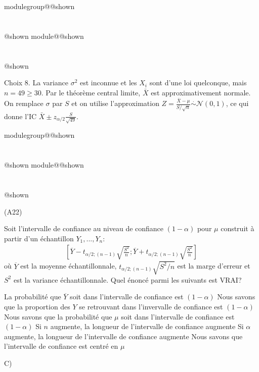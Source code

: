 \documentclass{Evaluation}
\makeatletter
\newcommand{\currentmodulekey}{}
\newcommand{\currentmoduletitle}{}
\newcommand{\currentgroupkey}{}
\newcommand{\currentgrouptitle}{}
\newcommand{\showmoduleifneeded}{%
  \ifx\currentgroupkey\empty\else
    \expandafter\ifx\csname modulegroup@\currentgroupkey @shown\endcsname\relax
      \section*{\currentgrouptitle}%
      \expandafter\gdef\csname modulegroup@\currentgroupkey @shown\endcsname{1}%
    \fi
  \fi
  \expandafter\ifx\csname module@\currentmodulekey @shown\endcsname\relax
    \section*{\currentmoduletitle}%
    \expandafter\gdef\csname module@\currentmodulekey @shown\endcsname{1}%
  \fi
}
\newenvironment{A22}{\showmoduleifneeded}{}
\newenvironment{A25}{\showmoduleifneeded}{}
\makeatother
\begin{document}
\begin{questions}
\begin{A25}
\begin{parts}
\medskip  
\begin{oneparcheckboxes}

 \end{oneparcheckboxes}\medskip
 \begin{solution}
 Choix 8. La variance $\sigma^2$ est inconnue et les $X_i$ sont d'une loi quelconque, mais $n = 49 \geq 30$. Par le théorème central limite, $\bar{X}$ est approximativement normale. On remplace $\sigma$ par $S$ et on utilise l'approximation $Z = \frac{\bar{X} - \mu}{S/\sqrt{n}} \stackrel{\cdot}{\sim} \mathcal{N}(0,1)$, ce qui donne l'IC $\bar{X} \pm z_{\alpha/2} \frac{S}{\sqrt{49}}$.
 \end{solution}
 \end{parts}
\end{A25}





\begin{A22}
\question
(A22)

Soit l'intervalle de confiance au niveau de confiance $(1-\alpha)$ pour $\mu$ construit à partir d'un échantillon $Y_1,...,Y_n$:
\begin{align*}
    \left[\overline{Y}- t_{\alpha/2;(n-1)}\sqrt{\frac{S^2}{n}};\overline{Y}+ t_{\alpha/2;(n-1)}\sqrt{\frac{S^2}{n}}\right]
\end{align*}
où $\overline{Y}$ est la moyenne échantillonnale, $t_{\alpha/2;(n-1)}\sqrt{S^2/n}$ est la marge d'erreur et $S^2$ est la variance échantillonnale.
Quel énoncé parmi les suivants est VRAI?

\begin{checkboxes}
    \choice La probabilité que $\overline{Y}$ soit dans l'intervalle de confiance est $(1-\alpha)$
    \choice Nous savons que la proportion des $Y$ se retrouvant dans l'invervalle de confiance est $(1-\alpha)$
    \CorrectChoice Nous savons que la probabilité que $\mu$ soit dans l'intervalle de confiance est $(1-\alpha)$
    \choice Si $n$ augmente, la longueur de l'intervalle de confiance augmente
    \choice Si $\alpha$ augmente, la longueur de l'intervalle de confiance augmente
    \choice Nous savons que l'intervalle de confiance est centré en $\mu$
\end{checkboxes}

\begin{solution}
C)
\end{solution}


\end{A22}
\end{questions}
\end{document}
